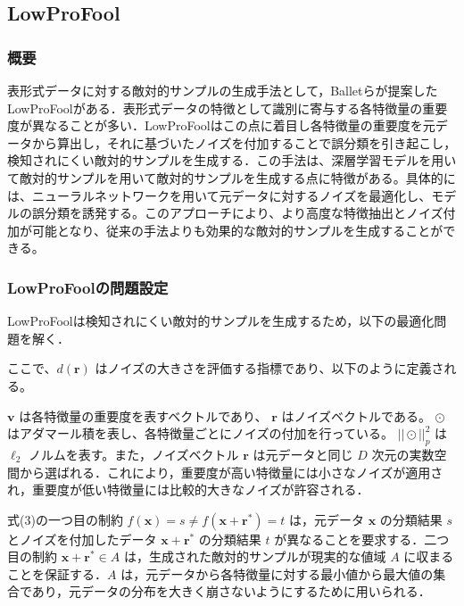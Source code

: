 \subsection{LowProFool}
\subsubsection{概要}
表形式データに対する敵対的サンプルの生成手法として，Balletらが提案したLowProFool\cite{ballet2019imperceptible}がある．表形式データの特徴として識別に寄与する各特徴量の重要度が異なることが多い．LowProFoolはこの点に着目し各特徴量の重要度を元データから算出し，それに基づいたノイズを付加することで誤分類を引き起こし，検知されにくい敵対的サンプルを生成する．この手法は、深層学習モデルを用いて敵対的サンプルを用いて敵対的サンプルを生成する点に特徴がある。具体的には、ニューラルネットワークを用いて元データに対するノイズを最適化し、モデルの誤分類を誘発する。このアプローチにより、より高度な特徴抽出とノイズ付加が可能となり、従来の手法よりも効果的な敵対的サンプルを生成することができる。

\subsubsection{LowProFoolの問題設定}
LowProFoolは検知されにくい敵対的サンプルを生成するため，以下の最適化問題を解く．

ここで、$d(\bm{r})$ はノイズの大きさを評価する指標であり、以下のように定義される。

$\bm{v}$ は各特徴量の重要度を表すベクトルであり、 $\bm{r}$ はノイズベクトルである。 $\odot$ はアダマール積を表し、各特徴量ごとにノイズの付加を行っている。 $||\odot||^2_p$ は $\ell_2$ ノルムを表す。また，ノイズベクトル $\bm{r}$ は元データと同じ $D$ 次元の実数空間から選ばれる．これにより，重要度が高い特徴量には小さなノイズが適用され，重要度が低い特徴量には比較的大きなノイズが許容される．

式(3)の一つ目の制約 $f(\bm{x}) = s \neq f(\bm{x}+\bm{r}^*) = t$ は，元データ $\bm{x}$ の分類結果 $s$ とノイズを付加したデータ $\bm{x}+\bm{r}^*$ の分類結果 $t$ が異なることを要求する．二つ目の制約 $\bm{x}+\bm{r}^* \in A$ は，生成された敵対的サンプルが現実的な値域 $A$ に収まることを保証する．$A$ は，元データから各特徴量に対する最小値から最大値の集合であり，元データの分布を大きく崩さないようにするために用いられる．

